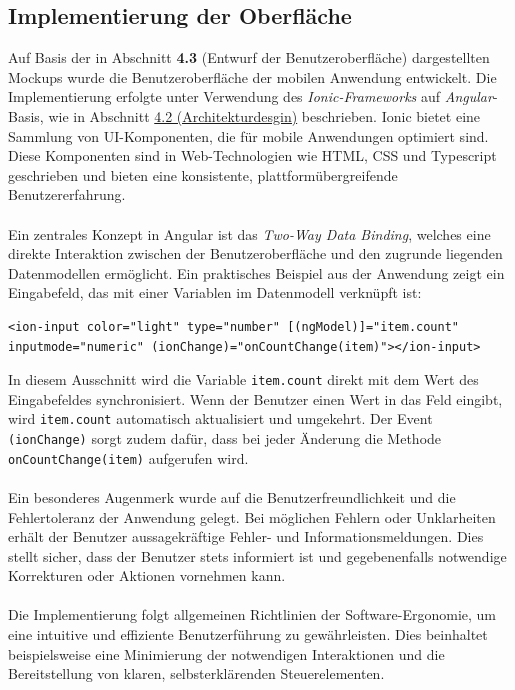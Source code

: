 \documentclass[a4paper,12pt]{article}
\begin{document}
\subsection{Implementierung der Oberfläche}
Auf Basis der in Abschnitt \textbf{4.3} (Entwurf der Benutzeroberfläche) dargestellten Mockups wurde die Benutzeroberfläche der mobilen Anwendung entwickelt. Die Implementierung erfolgte unter Verwendung des \textit{Ionic-Frameworks} auf \textit{Angular}-Basis, wie in Abschnitt \hyperref[sec:architekturdesign]{4.2 (Architekturdesgin)} beschrieben. Ionic bietet eine Sammlung von UI-Komponenten, die für mobile Anwendungen optimiert sind. Diese Komponenten sind in Web-Technologien wie HTML, CSS und Typescript geschrieben und bieten eine konsistente, plattformübergreifende Benutzererfahrung.\\
\\
Ein zentrales Konzept in Angular ist das \textit{Two-Way Data Binding}, welches eine direkte Interaktion zwischen der Benutzeroberfläche und den zugrunde liegenden Datenmodellen ermöglicht. Ein praktisches Beispiel aus der Anwendung zeigt ein Eingabefeld, das mit einer Variablen im Datenmodell verknüpft ist:
\begin{verbatim}
<ion-input color="light" type="number" [(ngModel)]="item.count" 
inputmode="numeric" (ionChange)="onCountChange(item)"></ion-input>
\end{verbatim}
In diesem Ausschnitt wird die Variable \texttt{item.count} direkt mit dem Wert des Eingabefeldes synchronisiert. Wenn der Benutzer einen Wert in das Feld eingibt, wird \texttt{item.count} automatisch aktualisiert und umgekehrt. Der Event \texttt{(ionChange)} sorgt zudem dafür, dass bei jeder Änderung die Methode \texttt{onCountChange(item)} aufgerufen wird.\\
\\
Ein besonderes Augenmerk wurde auf die Benutzerfreundlichkeit und die Fehlertoleranz der Anwendung gelegt. Bei möglichen Fehlern oder Unklarheiten erhält der Benutzer aussagekräftige Fehler- und Informationsmeldungen. Dies stellt sicher, dass der Benutzer stets informiert ist und gegebenenfalls notwendige Korrekturen oder Aktionen vornehmen kann.\\
\\
Die Implementierung folgt allgemeinen Richtlinien der Software-Ergonomie, um eine intuitive und effiziente Benutzerführung zu gewährleisten. Dies beinhaltet beispielsweise eine Minimierung der notwendigen Interaktionen und die Bereitstellung von klaren, selbsterklärenden Steuerelementen.
\end{document}
